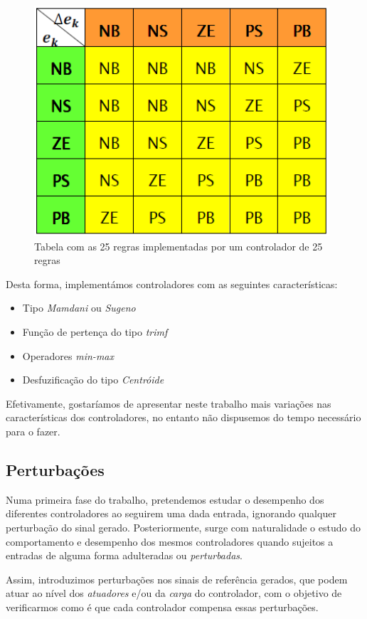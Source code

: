 \documentclass{article}
\begin{document}
\begin{figure}[H]
  \centering
      \includegraphics[scale=0.5]{Images/25_Rules.png}
  \caption{Tabela com as 25 regras implementadas por um controlador de 25 regras}
\end{figure}

Desta forma, implementámos controladores com as seguintes características:

\begin{itemize}
\item Tipo \emph{Mamdani} ou \emph{Sugeno}
\item Função de pertença do tipo \emph{trimf}
\item Operadores \emph{min-max}
\item Desfuzificação do tipo \emph{Centróide}
\end{itemize}

Efetivamente, gostaríamos de apresentar neste trabalho mais variações nas características dos controladores, no entanto não dispusemos do tempo necessário para o fazer.


\subsection{Perturbações}

Numa primeira fase do trabalho, pretendemos estudar o desempenho dos diferentes controladores ao seguirem uma dada entrada, ignorando qualquer perturbação do sinal gerado. Posteriormente, surge com naturalidade o estudo do comportamento e desempenho dos mesmos controladores quando sujeitos a entradas de alguma forma adulteradas ou \emph{perturbadas}.

Assim, introduzimos perturbações nos sinais de referência gerados, que podem atuar ao nível dos \emph{atuadores} e/ou da \emph{carga} do controlador, com o objetivo de verificarmos como é que cada controlador compensa essas perturbações.
\end{document}
